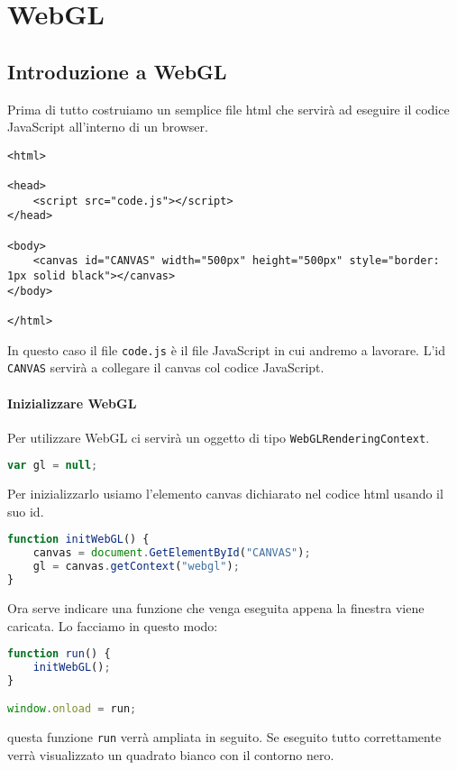 \part{WebGL}
\chapter{Introduzione a WebGL}
Prima di tutto costruiamo un semplice file html che servir\`a ad eseguire il codice JavaScript
all'interno di un browser.
\begin{lstlisting}[language=html5]
<html>

<head>
	<script src="code.js"></script>
</head>

<body>
	<canvas id="CANVAS" width="500px" height="500px" style="border: 1px solid black"></canvas>
</body>

</html>
\end{lstlisting}
In questo caso il file \verb|code.js| \`e il file JavaScript in cui andremo a lavorare.
L'id \verb|CANVAS| servir\`a a collegare il canvas col codice JavaScript.

\subsection{Inizializzare WebGL}
Per utilizzare WebGL ci servir\`a un oggetto di tipo \verb|WebGLRenderingContext|.
\begin{lstlisting}[language=javascript]
var gl = null;
\end{lstlisting}
Per inizializzarlo usiamo l'elemento canvas dichiarato nel codice html usando il suo id.
\begin{lstlisting}[language=javascript, firstnumber=2]
function initWebGL() {
	canvas = document.GetElementById("CANVAS");
	gl = canvas.getContext("webgl");
}
\end{lstlisting}
Ora serve indicare una funzione che venga eseguita appena la finestra viene caricata. Lo
facciamo in questo modo:
\begin{lstlisting}[language=javascript, firstnumber=6]
function run() {
	initWebGL();
}

window.onload = run;
\end{lstlisting}
questa funzione \verb|run| verr\`a ampliata in seguito.
Se eseguito tutto correttamente verr\`a visualizzato un quadrato bianco con il contorno nero.

